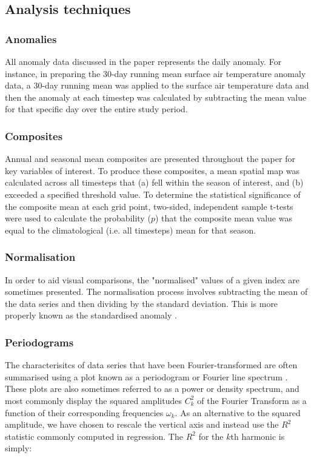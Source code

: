 \subsection{Analysis techniques}

\subsubsection{Anomalies}
All anomaly data discussed in the paper represents the daily anomaly. For instance, in preparing the 30-day running mean surface air temperature anomaly data, a 30-day running mean was applied to the surface air temperature data and then the anomaly at each timestep was calculated by subtracting the mean value for that specific day over the entire study period.

\subsubsection{Composites}
Annual and seasonal mean composites are presented throughout the paper for key variables of interest. To produce these composites, a mean spatial map was calculated across all timesteps that (a) fell within the season of interest, and (b) exceeded a specified threshold value. To determine the statistical significance of the composite mean at each grid point, two-sided, independent sample t-tests were used to calculate the probability ($p$) that the composite mean value was equal to the climatological (i.e. all timesteps) mean for that season.

\subsubsection{Normalisation}
In order to aid visual comparisons, the "normalised" values of a given index are sometimes presented. The normalisation process involves subtracting the mean of the data series and then dividing by the standard deviation. This is more properly known as the standardised anomaly \citep{Wilks2011}. 

\subsubsection{Periodograms} %
The characterisitcs of data series that have been Fourier-transformed are often summarised using a plot known as a periodogram or Fourier line spectrum \citep{Wilks2011}. These plots are also sometimes referred to as a power or density spectrum, and most commonly display the squared amplitudes $C_k^2$ of the Fourier Transform as a function of their corresponding frequencies $\omega_k$. As an alternative to the squared amplitude, we have chosen to rescale the vertical axis and instead use the $R^2$ statistic commonly computed in regression. The $R^2$ for the $k$th harmonic is simply:

